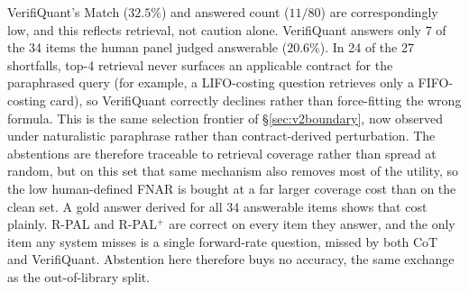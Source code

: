 \documentclass[sigconf,anonymous]{acmart}
\begin{document}
VerifiQuant's Match ($32.5\%$) and answered count ($11/80$) are correspondingly low, and this reflects retrieval, not caution alone. VerifiQuant answers only 7 of the 34 items the human panel judged answerable ($20.6\%$). In 24 of the 27 shortfalls, top-4 retrieval never surfaces an applicable contract for the paraphrased query (for example, a LIFO-costing question retrieves only a FIFO-costing card), so VerifiQuant correctly declines rather than force-fitting the wrong formula. This is the same selection frontier of \S\ref{sec:v2boundary}, now observed under naturalistic paraphrase rather than contract-derived perturbation. The abstentions are therefore traceable to retrieval coverage rather than spread at random, but on this set that same mechanism also removes most of the utility, so the low human-defined FNAR is bought at a far larger coverage cost than on the clean set. A gold answer derived for all 34 answerable items shows that cost plainly. R-PAL and R-PAL$^{+}$ are correct on every item they answer, and the only item any system misses is a single forward-rate question, missed by both CoT and VerifiQuant. Abstention here therefore buys no accuracy, the same exchange as the out-of-library split.
\end{document}
